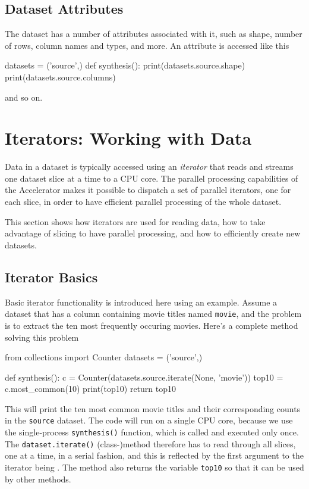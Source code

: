 \subsection{Dataset Attributes}
The dataset has a number of attributes associated with it, such as
shape, number of rows, column names and types, and more.
An attribute is accessed like this
\begin{python}
datasets = ('source',)
def synthesis():
    print(datasets.source.shape)
    print(datasets.source.columns)
\end{python}
and so on.



\section{Iterators: Working with Data}

Data in a dataset is typically accessed using an \emph{iterator} that
reads and streams one dataset slice at a time to a CPU core.  The
parallel processing capabilities of the Accelerator makes it possible
to dispatch a set of parallel iterators, one for each slice, in order
to have efficient parallel processing of the whole dataset.

This section shows how iterators are used for reading data, how to
take advantage of slicing to have parallel processing, and how to
efficiently create new datasets.


\subsection{Iterator Basics}

Basic iterator functionality is introduced here using an example.
Assume a dataset that has a column containing movie titles named
\texttt{movie}, and the problem is to extract the ten most frequently
occuring movies.  Here's a complete method solving this problem
\begin{python}
from collections import Counter
datasets = ('source',)

def synthesis():
    c = Counter(datasets.source.iterate(None, 'movie'))
    top10 = c.most_common(10)
    print(top10)
    return top10
\end{python}
This will print the ten most common movie titles and their
corresponding counts in the \texttt{source} dataset.  The code will
run on a single CPU core, because we use the single-process
\texttt{synthesis()} function, which is called and executed only once.
The \texttt{dataset.iterate()} (class-)method therefore has to read
through all slices, one at a time, in a serial fashion, and this is
reflected by the first argument to the iterator being \pyNone.  The
method also returns the variable \texttt{top10} so that it can be used
by other methods.



